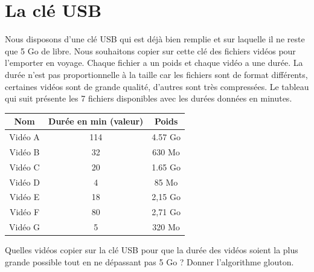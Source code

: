 \documentclass{article}[12pt]
\begin{document}
    
\section*{La clé USB}

Nous disposons d’une clé USB qui est déjà bien remplie et sur laquelle il ne reste que 5 Go de libre. Nous souhaitons copier sur cette clé des fichiers vidéos pour l’emporter en voyage. Chaque fichier a un poids et chaque vidéo a une durée. La durée n’est pas proportionnelle à la taille car les fichiers sont de format différents, certaines vidéos sont de grande qualité, d’autres sont très compressées. Le tableau qui suit présente les 7 fichiers disponibles avec les durées données en minutes.

\begin{table}[h!]
\centering
\begin{tabular}{|c|c|c|}
\hline
\multicolumn{1}{|c|}{\textbf{Nom}} & \multicolumn{1}{c|}{\textbf{Durée en min (valeur)}} & \multicolumn{1}{c|}{\textbf{Poids}} \\ \hline
Vidéo A                            & 114                                                 & 4.57 Go                             \\ \hline
Vidéo B                            & \multicolumn{1}{c|}{32}                             & 630 Mo                              \\ \hline
Vidéo C                            & 20                                                  & 1.65 Go                             \\ \hline
Vidéo D                            & 4                                                   & 85 Mo                               \\ \hline
Vidéo E                            & 18                                                  & 2,15 Go                             \\ \hline
Vidéo F                            & 80                                                  & 2,71 Go                             \\ \hline
Vidéo G                            & 5                                                   & 320 Mo                              \\ \hline
\end{tabular}
\end{table}

Quelles vidéos copier sur la clé USB pour que la durée des vidéos soient la plus grande possible tout en ne dépassant pas 5 Go ? Donner l'algorithme glouton.
\end{document}
